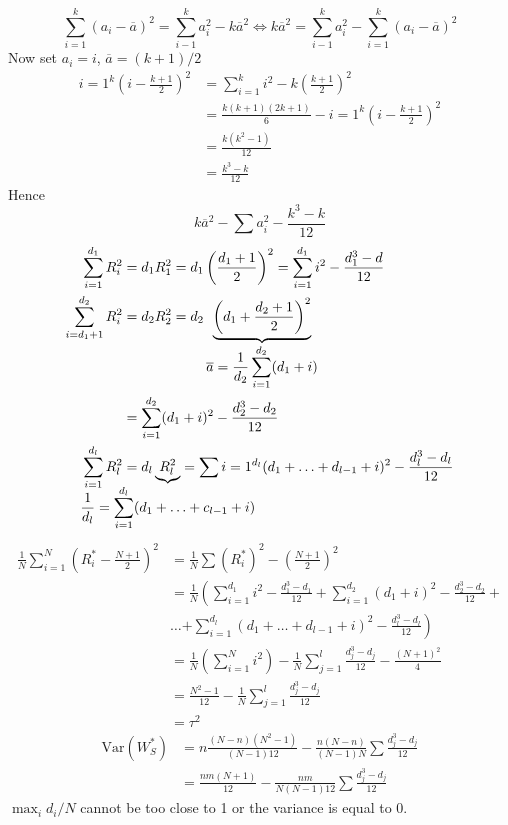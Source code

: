 \documentclass[a4paper,12pt]{amsart}
\newcommand{\Var}{\mbox{Var}}
\begin{document}
\[\sum_{i=1}^k (a_i - \overline{a})^2 = \sum_{i-1}^k a_i^2 - k \overline{a}^2 \Leftrightarrow k \overline{a}^2 = \sum_{i-1}^k a_i^2 - \sum_{i=1}^k (a_i - \overline{a})^2\]
Now set $a_i =i$, $\overline{a} = (k+1)/2$
\begin{align*}
{i=1}^k \left(i - \frac{k+1}{2}\right)^2 &= \sum_{i=1}^k i^2 - k \left(\frac{k+1}{2}\right)^2\\
&= \frac{k(k+1)(2k+1)}{6} - {i=1}^k \left(i - \frac{k+1}{2}\right)^2\\
&= \frac{k(k^2-1)}{12}\\
&= \frac{k^3-k}{12}
\end{align*}
Hence
\[k \overline{a}^2 - \sum a_i^2 - \frac{k^3-k}{12}\]
\begin{align*}
\sum_{i=1}^{d_1} R_i^2 &= d_1R_1^2 = d_1\left(\frac{d_1+1}{2}\right)^2 = \sum_{i=1}^{d_1}i^2 - \frac{d_1^3-d}{12}\\
\sum_{i=d_1+1}^{d_2}R_i^2 &= d_2R_2^2 = d_2\underbrace{\left(d_1 + \frac{d_2 + 1}{2}\right)^2}_{\displaystyle \overline{a} = \frac{1}{d_2}\sum_{i=1}^{d_2} (d_1 + i)}\\
&= \sum_{i=1}^{d_2}(d_1+i)^2 - \frac{d_2^3 - d_2}{12}\\
\sum_{i=1}^{d_l} R_l^2 &= d_l\underbrace{R_l^2}_{\mathclap{\displaystyle \frac{1}{d_l} = \sum_{i=1}^{d_l}(d_1 + \ldots + c_{l-1} + i)}} = \sum{i=1}^{d_l} (d_1 + \ldots + d_{l-1} + i)^2 - \frac{d_l^3-d_l}{12}
\end{align*}
\begin{align*}
\frac{1}{N} \sum_{i=1}^N \left(R_i^\ast - \frac{N+1}{2}\right)^2 &= \frac{1}{N}\sum (R_i^\ast)^2 - \left(\frac{N+1}{2}\right)^2\\
&= \frac{1}{N}\left(\sum_{i=1}^{d_1} i^2 - \frac{d_1^3 - d_1}{12} + \sum_{i=1}^{d_2} (d_1+i)^2 - \frac{d_2^3-d_2}{12} +\right. \\
&\ldots \left.+ \sum_{i=1}^{d_l} (d_1 + \ldots + d_{l-1} + i)^2 - \frac{d_l^3-d_l}{12}\right)\\
&=\frac{1}{N}\left(\sum_{i=1}^N i^2 \right) - \frac{1}{N}\sum_{j=1}^l \frac{d_j^3-d_j}{12} - \frac{(N+1)^2}{4}\\
&= \frac{N^2-1}{12} - \frac{1}{N}\sum_{j=1}^l \frac{d_j^3-d_j}{12}\\
&= \tau^2 
\end{align*}
\begin{align*}
\Var(W_S^\ast) &= n\frac{(N-n)(N^2-1)}{(N-1)12} - \frac{n(N-n)}{(N-1)N}\sum \frac{d_j^3-d_j}{12}\\
&= \frac{nm(N+1)}{12} - \frac{nm}{N(N-1)12} \sum \frac{d_j^3-d_j}{12}
\end{align*}
$\max_i d_i/N$ cannot be too close to 1 or the variance is equal to 0.
\end{document}

